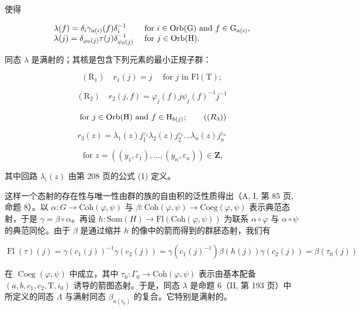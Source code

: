 使得

\[
\begin{array}{l l} \lambda (f) = \delta_ {i} \gamma_ {a (i)} (f) \delta_ {i} ^ {- 1} & \text { for } i \in \mathrm{Orb(G)} \text { and } f \in \mathrm{G} _ {a (i)}, \\ \lambda (j) = \delta_ {\varphi_ {0} (j)} \tau (j) \delta_ {\psi_ {0} (j)} ^ {- 1} & \text { for } j \in \mathrm{Orb(H)}. \end{array}
\]

同态 \(\lambda\) 是满射的；其核是包含下列元素的最小正规子群：

\[
\left(\mathrm{R} _ {1}\right) \quad r _ {1} (j) = j \quad \text { for } j \text { in } \mathrm{Fl} (\mathrm{T});
\]

\[
(\mathrm{R} _ {2}) \quad r _ {2} (j, f) = \varphi_ {j} (f) j \psi_ {j} (f) ^ {- 1} j ^ {- 1}
\]

\[
\text { for } j \in \operatorname{Orb} (\mathrm{H}) \text { and } f \in \mathrm{H} _ {b (j)};\tag{\((R_{3})\)}
\]

\[
r _ {3} (z) = \lambda_ {1} (z) j _ {1} ^ {\varepsilon_ {1}} \lambda_ {2} (z) j _ {2} ^ {\varepsilon_ {2}} \dots \lambda_ {n} (z) j _ {n} ^ {\varepsilon_ {n}}
\]

\[
\text { for } z = ((y _ {1}, \varepsilon_ {1}), \dots , (y _ {n}, \varepsilon_ {n})) \in \mathbf {Z},
\]

其中回路 \(\lambda_{i}(z)\) 由第 208 页的公式 (1) 定义。

这样一个态射的存在性与唯一性由群的族的自由积的泛性质得出（A, I, 第 85 页, 命题 8）。以 \(\alpha\colon G\to\mathrm{Coh}(\varphi,\psi)\) 与 \(\beta\colon\mathrm{Coh}(\varphi,\psi)\to\mathrm{Coeg}(\varphi,\psi)\) 表示典范态射，于是 \(\gamma=\beta\circ\alpha\)。再设 \(h\colon\mathrm{Som}(H)\to\mathrm{Fl}(\mathrm{Coh}(\varphi,\psi))\) 为联系 \(\alpha\circ\varphi\) 与 \(\alpha\circ\psi\) 的典范同伦。由于 \(\beta\) 是通过缩并 \(h\) 的像中的箭而得到的群胚态射，我们有

\[
\operatorname{Fl} (\tau) (j) = \gamma (c _ {1} (j)) ^ {- 1} \gamma (c _ {2} (j)) = \gamma (c _ {1} (j) ^ {- 1}) \beta (h (j)) \gamma (c _ {2} (j)) = \beta (\tau_ {0} (j))
\]

在 \(\operatorname{Coeg}(\varphi,\psi)\) 中成立，其中 \(\tau_{0}\colon\Gamma_{0}\to\mathrm{Coh}(\varphi,\psi)\) 表示由基本配备 \((a,b,c_{1},c_{2},\mathrm{T},i_{0})\) 诱导的箭图态射。于是，同态 \(\lambda\) 是命题 6（II, 第 193 页）中所定义的同态 \(\Lambda\) 与满射同态 \(\beta_{a(i_0)}\) 的复合。它特别是满射的。

